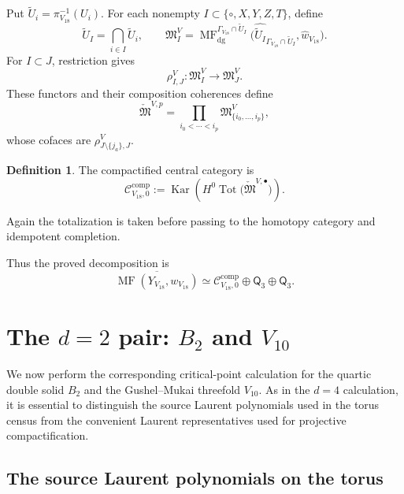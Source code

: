 \documentclass[11pt]{amsart}
\theoremstyle{definition}
\newtheorem{definition}[theorem]{Definition}
\theoremstyle{remark}
\DeclareMathOperator{\MF}{MF}
\DeclareMathOperator{\Tot}{Tot}
\DeclareMathOperator{\Kar}{Kar}
\newcommand{\MorseCat}[1]{\mathsf{Q}_{#1}}
\newcommand{\CcompV}{\mathcal C^{\mathrm{comp}}_{V_{18},0}}
\begin{document}
Put $\widetilde U_i=\pi_{V_{18}}^{-1}(U_i)$.
For each nonempty $I\subset\{\circ,X,Y,Z,T\}$, define
\[
\widetilde U_I=\bigcap_{i\in I}\widetilde U_i,
\qquad
\mathfrak M^V_I=
\MF^{\Gamma_{V_{18}}\cap\widetilde U_I}_{\mathrm{dg}}
\bigl(\widehat{\widetilde U_I}_{\Gamma_{V_{18}}\cap\widetilde U_I},
\widehat w_{V_{18}}\bigr).
\]
For $I\subset J$, restriction gives
\begin{equation}
\label{eq:V18_cech_restriction}
\rho^V_{I,J}:\mathfrak M^V_I\longrightarrow\mathfrak M^V_J.
\end{equation}
These functors and their composition coherences define
\[
\check{\mathfrak M}^{V,p}
=
\prod_{i_0<\cdots<i_p}
\mathfrak M^V_{\{i_0,\ldots,i_p\}},
\]
whose cofaces are $\rho^V_{J\setminus\{j_a\},J}$.

\begin{definition}
\label{def:V18_comp_category}
The compactified central category is
\begin{equation}
\label{eq:V18_cech_totalization}
\CcompV
:=
\Kar\!\left(
H^0\Tot\bigl(\check{\mathfrak M}^{V,\bullet}\bigr)
\right).
\end{equation}
\end{definition}

Again the totalization is taken before passing to the homotopy category and
idempotent completion.

Thus the proved decomposition is
\begin{equation}
\label{eq:V18_final_decomposition}
\overline{\MF(Y_{V_{18}},w_{V_{18}})}
\simeq
\CcompV\oplus\MorseCat{3}\oplus\MorseCat{3}.
\end{equation}

\section{The \texorpdfstring{$d=2$}{d=2} pair: \texorpdfstring{$B_2$ and $V_{10}$}{B2 and V10}}
\label{sec:B2_V10_calculation}

We now perform the corresponding critical-point calculation for the quartic
double solid $B_2$ and the Gushel--Mukai threefold $V_{10}$.  As in the
$d=4$ calculation, it is essential to distinguish the source Laurent
polynomials used in the torus census from the convenient Laurent
representatives used for projective compactification.

\subsection{The source Laurent polynomials on the torus}
\end{document}
